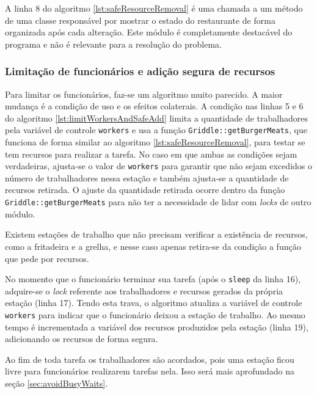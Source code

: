 \documentclass[a4paper]{article}
\begin{document}
A linha 8 do algoritmo \ref{lst:safeResourceRemoval} é uma chamada a um método de uma classe responsável por mostrar o estado do restaurante de forma organizada após cada alteração. Este módulo é completamente destacável do programa e não é relevante para a resolução do problema.

\subsubsection{Limitação de funcionários e adição segura de recursos}
\label{sec:limitWorkersAndSafeAdd}

Para limitar os funcionários, faz-se um algoritmo muito parecido. A maior mudança é a condição de uso e os efeitos colaterais. A condição nas linhas 5 e 6 do algoritmo \ref{lst:limitWorkersAndSafeAdd}	limita a quantidade de trabalhadores pela variável de controle \texttt{workers} e usa a função \texttt{Griddle::getBurgerMeats}, que funciona de forma similar ao algoritmo \ref{lst:safeResourceRemoval}, para testar se tem recursos para realizar a tarefa. No caso em que ambas as condições sejam verdadeiras, ajusta-se o valor de \texttt{workers} para garantir que não sejam excedidos o número de trabalhadores nessa estação e também ajusta-se a quantidade de recursos retirada. O ajuste da quantidade retirada ocorre dentro da função \texttt{Griddle::getBurgerMeats} para não ter a necessidade de lidar com \textit{locks} de outro módulo.

Existem estações de trabalho que não precisam verificar a existência de recursos, como a fritadeira e a grelha, e nesse caso apenas retira-se da condição a função que pede por recursos.

No momento que o funcionário terminar sua tarefa (após o \texttt{sleep} da linha 16), adquire-se o \textit{lock} referente aos trabalhadores e recursos gerados da própria estação (linha 17). Tendo esta trava, o algoritmo atualiza a variável de controle \texttt{workers} para indicar que o funcionário deixou a estação de trabalho. Ao mesmo tempo é incrementada a variável dos recursos produzidos pela estação (linha 19), adicionando os recursos de forma segura.

Ao fim de toda tarefa os trabalhadores são acordados, pois uma estação ficou livre para funcionários realizarem tarefas nela. Isso será mais aprofundado na seção \ref{sec:avoidBusyWaits}.
\end{document}
